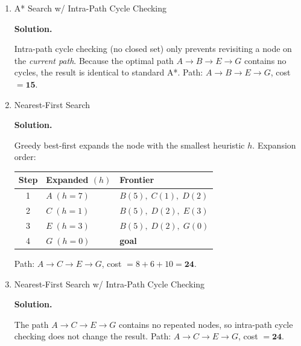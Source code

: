 \documentclass[12pt]{article}
\newenvironment{solution}{%
  \ifshowsolutions\begin{solutionbox}\noindent\textbf{\color{blue!70!black}Solution.}\quad\fi
  \ifshowsolutions\else\expandafter\comment\fi
}{%
  \ifshowsolutions\end{solutionbox}\fi
  \ifshowsolutions\else\expandafter\endcomment\fi
}
\begin{document}
\begin{enumerate}
\begin{enumerate}
\item A* Search w/ Intra-Path Cycle Checking

\begin{solution}
  Intra-path cycle checking (no closed set) only prevents revisiting a node on the \emph{current path}. Because the optimal path $A\!\to\!B\!\to\!E\!\to\!G$ contains no cycles, the result is identical to standard A*. Path: $A \to B \to E \to G$, cost $= \mathbf{15}$.
\end{solution}

\item Nearest-First Search

\begin{solution}
  Greedy best-first expands the node with the smallest heuristic $h$. Expansion order:
  \begin{center}
  \begin{tabular}{cll}
    Step & Expanded $(h)$ & Frontier \\\hline
    1 & $A\;(h=7)$ & $B(5),\;C(1),\;D(2)$ \\
    2 & $C\;(h=1)$ & $B(5),\;D(2),\;E(3)$ \\
    3 & $E\;(h=3)$ & $B(5),\;D(2),\;G(0)$ \\
    4 & $G\;(h=0)$ & \textbf{goal}
  \end{tabular}
  \end{center}
  Path: $A \to C \to E \to G$, cost $= 8+6+10 = \mathbf{24}$.
\end{solution}

\item Nearest-First Search w/ Intra-Path Cycle Checking

\begin{solution}
  The path $A\!\to\!C\!\to\!E\!\to\!G$ contains no repeated nodes, so intra-path cycle checking does not change the result. Path: $A \to C \to E \to G$, cost $= \mathbf{24}$.
\end{solution}

\end{enumerate}
\end{enumerate}

\clearpage
\end{document}
